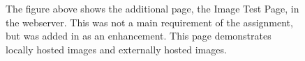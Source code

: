  \begin{figure}[!htbp]
  \caption{The figure above shows the additional page, the Image Test Page, in the webserver. This was not a main requirement of the assignment, but was added in as an enhancement. This page demonstrates locally hosted images and externally hosted images.}
\end{figure}
